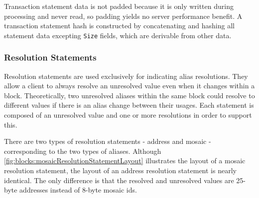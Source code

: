 Transaction statement data is not padded because it is only written during processing and never read, so padding yields no server performance benefit.
A transaction statement hash is constructed by concatenating and hashing all statement data excepting \texttt{Size} fields, which are derivable from other data.

\subsubsection{Resolution Statements}

Resolution statements are used exclusively for indicating alias resolutions.
They allow a client to always resolve an unresolved value even when it changes within a block.
Theoretically, two unresolved aliases within the same block could resolve to different values if there is an alias change between their usages.
Each statement is composed of an unresolved value and one or more resolutions in order to support this.

There are two types of resolution statements - address and mosaic - corresponding to the two types of aliases.
Although \autoref{fig:blocks:mosaicResolutionStatementLayout} illustrates the layout of a mosaic resolution statement, the layout of an address resolution statement is nearly identical.
The only difference is that the resolved and unresolved values are 25-byte addresses instead of 8-byte mosaic ids.

\begin{figure}[H]
\end{figure}

